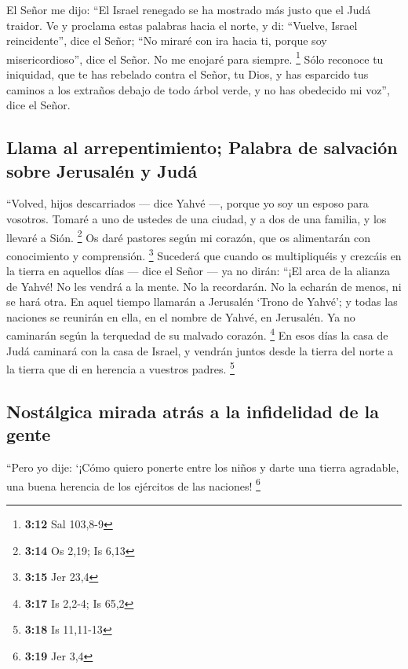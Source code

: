 \begin{paracol}{2}
 El Señor me dijo: ``El Israel renegado se ha mostrado
más justo que el Judá traidor.  Ve y proclama estas
palabras hacia el norte, y di: ``Vuelve, Israel reincidente'', dice el
Señor; ``No miraré con ira hacia ti, porque soy misericordioso'', dice
el Señor. No me enojaré para siempre. \footnote{\textbf{3:12} Sal
  103,8-9}  Sólo reconoce tu iniquidad, que te has
rebelado contra el Señor, tu Dios, y has esparcido tus caminos a los
extraños debajo de todo árbol verde, y no has obedecido mi voz'', dice
el Señor.

\hypertarget{llama-al-arrepentimiento-palabra-de-salvaciuxf3n-sobre-jerusaluxe9n-y-juduxe1}{%
\subsection{Llama al arrepentimiento; Palabra de salvación sobre
Jerusalén y
Judá}\label{llama-al-arrepentimiento-palabra-de-salvaciuxf3n-sobre-jerusaluxe9n-y-juduxe1}}

 ``Volved, hijos descarriados --- dice Yahvé ---, porque
yo soy un esposo para vosotros. Tomaré a uno de ustedes de una ciudad, y
a dos de una familia, y los llevaré a Sión. \footnote{\textbf{3:14} Os
  2,19; Is 6,13}  Os daré pastores según mi corazón, que
os alimentarán con conocimiento y comprensión. \footnote{\textbf{3:15}
  Jer 23,4}  Sucederá que cuando os multipliquéis y
crezcáis en la tierra en aquellos días --- dice el Señor --- ya no
dirán: ``¡El arca de la alianza de Yahvé! No les vendrá a la mente. No
la recordarán. No la echarán de menos, ni se hará otra. 
En aquel tiempo llamarán a Jerusalén `Trono de Yahvé'; y todas las
naciones se reunirán en ella, en el nombre de Yahvé, en Jerusalén. Ya no
caminarán según la terquedad de su malvado corazón. \footnote{\textbf{3:17}
  Is 2,2-4; Is 65,2}  En esos días la casa de Judá
caminará con la casa de Israel, y vendrán juntos desde la tierra del
norte a la tierra que di en herencia a vuestros padres. \footnote{\textbf{3:18}
  Is 11,11-13}

\hypertarget{nostuxe1lgica-mirada-atruxe1s-a-la-infidelidad-de-la-gente}{%
\subsection{Nostálgica mirada atrás a la infidelidad de la
gente}\label{nostuxe1lgica-mirada-atruxe1s-a-la-infidelidad-de-la-gente}}

 ``Pero yo dije: `¡Cómo quiero ponerte entre los niños y
darte una tierra agradable, una buena herencia de los ejércitos de las
naciones! \footnote{\textbf{3:19} Jer 3,4}


\end{paracol}
